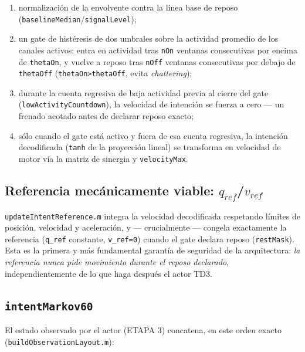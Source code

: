 \documentclass[11pt,a4paper]{article}
\begin{document}
\begin{enumerate}
  \item normalización de la envolvente contra la línea base de reposo
    (\texttt{baselineMedian}/\texttt{signalLevel});
  \item un gate de histéresis de dos umbrales sobre la actividad promedio de los
    canales activos: entra en actividad tras \texttt{nOn} ventanas consecutivas por
    encima de \texttt{thetaOn}, y vuelve a reposo tras \texttt{nOff} ventanas
    consecutivas por debajo de \texttt{thetaOff} (\texttt{thetaOn>thetaOff}, evita
    \emph{chattering});
  \item durante la cuenta regresiva de baja actividad previa al cierre del gate
    (\texttt{lowActivityCountdown}), la velocidad de intención se fuerza a cero --- un
    frenado acotado antes de declarar reposo exacto;
  \item sólo cuando el gate está activo y fuera de esa cuenta regresiva, la intención
    decodificada (\texttt{tanh} de la proyección lineal) se transforma en velocidad de
    motor vía la matriz de sinergia y \texttt{velocityMax}.
\end{enumerate}

\subsection{Referencia mecánicamente viable: \texorpdfstring{$q_{ref}$}{q\_ref}/\texorpdfstring{$v_{ref}$}{v\_ref}}

\texttt{updateIntentReference.m} integra la velocidad decodificada respetando límites
de posición, velocidad y aceleración, y --- crucialmente --- congela exactamente la
referencia (\texttt{q\_ref} constante, \texttt{v\_ref=0}) cuando el gate declara reposo
(\texttt{restMask}). Esta es la primera y más fundamental garantía de seguridad de la
arquitectura: \emph{la referencia nunca pide movimiento durante el reposo declarado},
independientemente de lo que haga después el actor TD3.

\subsection{\texttt{intentMarkov60}}

El estado observado por el actor (ETAPA 3) concatena, en este orden exacto
(\texttt{buildObservationLayout.m}):
\end{document}
